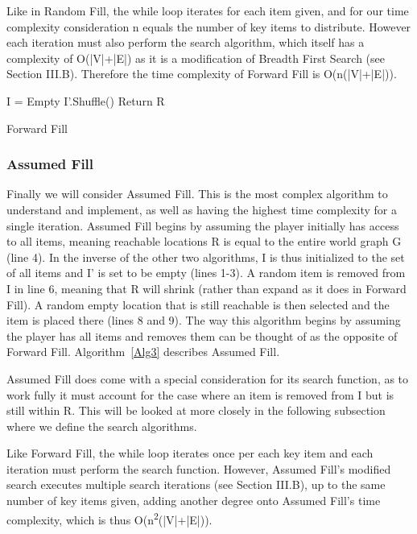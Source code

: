 \documentclass{ieeeaccess}
\begin{document}
Like in Random Fill, the while loop iterates for each item given, and for our time complexity
consideration n equals the number of key items to distribute. However each iteration must also
perform the search algorithm, which itself has a complexity of O(|V|+|E|) as it is a
modification of Breadth First Search (see Section III.B). 
Therefore the time complexity of Forward Fill is
O(n(|V|+|E|)).

\begin{algorithm}
\label{Alg2}
\SetAlgoLined
{}
    I = Empty\;
    I'.Shuffle()\;
    Return R\;
 \caption{Forward Fill}
\end{algorithm}

\subsubsection{Assumed Fill}
Finally we will consider Assumed Fill. This is the most complex algorithm to understand and
implement, as well as having the highest time complexity for a single iteration. Assumed Fill
begins by assuming the player initially has access to all items, meaning reachable locations R
is equal to the entire world graph G (line 4). In the inverse of the other two algorithms, I is thus
initialized to the set of all items and I' is set to be empty (lines 1-3). A random item
is removed from I in line 6, meaning that R will shrink (rather than expand as it does in Forward Fill).
A random empty location that is still reachable is then selected and the item is placed there 
(lines 8 and 9). The way this algorithm begins by assuming the player has all items and removes 
them can be thought of as the opposite of Forward Fill. Algorithm~\ref{Alg3} describes Assumed Fill.

Assumed Fill does come with a special consideration for its search function, as to work fully it
must account for the case where an item is removed from I but is still within R. This will be
looked at more closely in the following subsection where we define the search algorithms.

Like Forward Fill, the while loop iterates once per each key item and each iteration must
perform the search function. However, Assumed Fill's modified search executes multiple search
iterations (see Section III.B), up to the same number of key items given, 
adding another degree onto Assumed Fill's
time complexity, which is thus O(n\textsuperscript{2}(|V|+|E|)).
\end{document}
